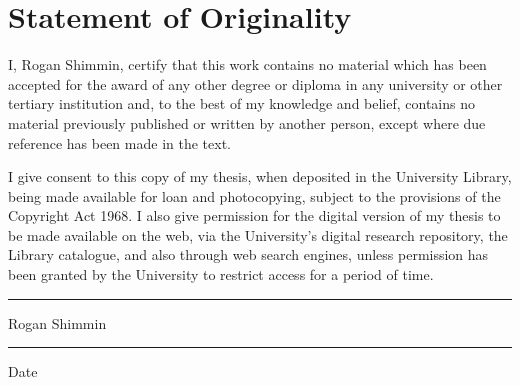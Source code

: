 \chapter*{Statement of Originality}
{}

\vfill



I, Rogan Shimmin, certify that this work contains no material which has been accepted for the award of any other degree or diploma in any university or other tertiary institution and, to the best of my knowledge and belief, contains no material previously published or written by another person, except where due reference has been made in the text. 

I give consent to this copy of my thesis, when deposited in the University Library, being made available for loan and photocopying, subject to the provisions of the Copyright Act 1968. I also give permission for the digital version of my thesis to be made available on the web, via the University's digital research repository, the Library catalogue, and also through web search engines, unless permission has been granted by the University to restrict access for a period of time.\\[2cm]

\rule{100mm}{0.5mm}

Rogan Shimmin\\[10mm]

\rule{100mm}{0.5mm}

Date

\vfill